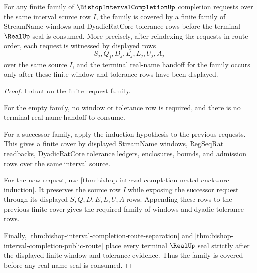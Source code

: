 \begin{theorem}
\label{thm:bishop-interval-completion-dyadic-window-covering}
For any finite family of $\BishopIntervalCompletionUp$ completion requests over the same interval source row $I$, the family is covered by a finite family of StreamName windows and DyadicRatCore tolerance rows before the terminal $\RealUp$ seal is consumed. More precisely, after reindexing the requests in route order, each request is witnessed by displayed rows
$$
S_j,Q_j,D_j,E_j,L_j,U_j,A_j
$$
over the same source $I$, and the terminal real-name handoff for the family occurs only after these finite window and tolerance rows have been displayed.
\end{theorem}
\begin{proof}
Induct on the finite request family.

For the empty family, no window or tolerance row is required, and there is no terminal real-name handoff to consume.

For a successor family, apply the induction hypothesis to the previous requests. This gives a finite cover by displayed StreamName windows, RegSeqRat readbacks, DyadicRatCore tolerance ledgers, enclosures, bounds, and admission rows over the same interval source.

For the new request, use \autoref{thm:bishop-interval-completion-nested-enclosure-induction}. It preserves the source row $I$ while exposing the successor request through its displayed $S,Q,D,E,L,U,A$ rows. Appending these rows to the previous finite cover gives the required family of windows and dyadic tolerance rows.

Finally, \autoref{thm:bishop-interval-completion-route-separation} and \autoref{thm:bishop-interval-completion-public-route} place every terminal $\RealUp$ seal strictly after the displayed finite-window and tolerance evidence. Thus the family is covered before any real-name seal is consumed.
\end{proof}


